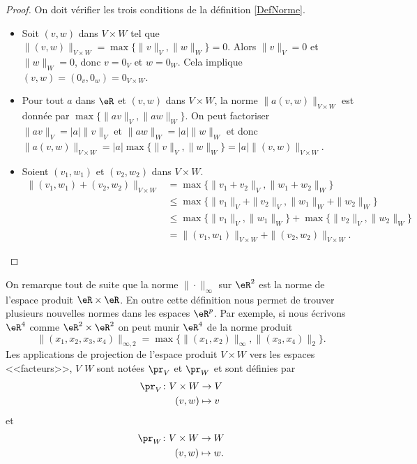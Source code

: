 \begin{proof}
	On doit vérifier les trois conditions de la définition \ref{DefNorme}.
	\begin{itemize}
		\item Soit $(v,w)$ dans $V\times W$ tel que $\|(v,w)\|_{V\times W}=\max\{\|v\|_{V},\|w\|_W\}=0$. Alors $\|v\|_V=0$ et $\|w\|_W=0$, donc $v=0_V$ et $w=0_W$. Cela implique $(v,w)=(0_v,0_w)=0_{V\times W}$. 
		\item Pour tout $a$ dans $\eR$ et $(v,w)$ dans $V\times W$,  la norme $\|a (v,w)\|_{V\times W}$ est donnée par  $\max\{\|av\|_{V},\|aw\|_W\}$. On peut factoriser $\|av\|_{V}=|a|\|v\|_{V}$ et $\|aw\|_W=|a|\|w\|_W$ et donc $\|a (v,w)\|_{V\times W}=|a|\max\{\|v\|_{V},\|w\|_W\}=|a|\|(v,w)\|_{V\times W}$.
		\item Soient $(v_1,w_1)$ et $(v_2,w_2)$ dans $V\times W$. 
		\begin{equation}
			\begin{aligned}
				\|(v_1,w_1)+(v_2,w_2)\|_{V\times W}&=\max\{\|v_1+v_2\|_{V},\|w_1+w_2\|_W\}\\
				&\leq \max\{\|v_1\|_V+\|v_2\|_{V},\|w_1\|_W+\|w_2\|_W\}\\
				&\leq\max\{\|v_1\|_V,\|w_1\|_W\}+ \max\{\|v_2\|_{V},\|w_2\|_W\}\\
				&=\|(v_1,w_1)\|_{V\times W}+\|(v_2,w_2)\|_{V\times W}.
			\end{aligned}
		\end{equation}
	\end{itemize} 
\end{proof}
On remarque tout de suite que la norme $\|\cdot\|_\infty$ sur $\eR^2$ est la norme de l'espace produit $\eR\times\eR$. En outre cette définition nous permet de trouver plusieurs nouvelles normes dans les espaces $\eR^p$. Par exemple, si nous écrivons $\eR^4$ comme $\eR^2\times \eR^2$ on peut munir $\eR^4$ de la norme produit
\[
\|(x_1,x_2,x_3,x_4)\|_{\infty, 2}=\max\{\|(x_1,x_2)\|_\infty, \|(x_3,x_4)\|_2\}. 
\]    
Les applications de projection de l'espace produit $V\times W$ vers les espaces <<facteurs>>, $V$ $W$ sont notées $\pr_V$ et $\pr_W$ et sont définies par
\begin{equation}
	\begin{aligned}
		\pr_V\colon V\times W&\to V \\
		(v,w)&\mapsto v 
	\end{aligned}
\end{equation}
et
\begin{equation}
	\begin{aligned}
		\pr_W\colon V\times W &\to W \\
		(v,w)&\mapsto w. 
	\end{aligned}
\end{equation}
